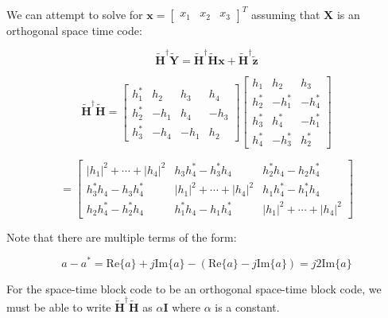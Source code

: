 \documentclass[fleqn]{article}
\begin{document}
\begin{enumerate}
\begin{enumerate}
			We can attempt to solve for $\mathbf{x} = \begin{bmatrix} x_1 & x_2 & x_3 \end{bmatrix}^T$ assuming that $\mathbf{X}$ is an orthogonal space time code:
			
			\begin{equation*}
				\mathbf{\tilde{H}^\dagger\tilde{Y}} = \mathbf{\tilde{H}^\dagger\tilde{H}x} + \mathbf{\tilde{H}^\dagger\tilde{z}}
			\end{equation*}
			
			\begin{equation*}
				\mathbf{\tilde{H}^\dagger\tilde{H}} = \begin{bmatrix}
					h_1^* &  h_2 &  h_3 &  h_4 \\
					h_2^* & -h_1 &  h_4 & -h_3 \\
					h_3^* & -h_4 & -h_1 &  h_2
				\end{bmatrix} \begin{bmatrix}
					h_1   &  h_2   &  h_3 \\
				    h_2^* & -h_1^* & -h_4^* \\
					h_3^* &  h_4^* & -h_1^* \\
					h_4^* & -h_3^* &  h_2^*
				\end{bmatrix}
			\end{equation*}
			
			\begin{equation*}
				= \begin{bmatrix}
					|h_1|^2 + \cdots + |h_4|^2 & h_3h_4^* - h_3^*h_4 & h_2^*h_4 - h_2h_4^* \\
					h_3^*h_4 - h_3h_4^* & |h_1|^2 + \cdots + |h_4|^2 & h_1h_4^* - h_1^*h_4 \\
					h_2h_4^* - h_2^*h_4 & h_1^*h_4 - h_1h_4^* & |h_1|^2 + \cdots + |h_4|^2
				\end{bmatrix}
			\end{equation*}
			
			Note that there are multiple terms of the form:
			
			\begin{equation*}
				a - a^* = \text{Re}\{a\} + j\text{Im}\{a\} - (\text{Re}\{a\} - j\text{Im}\{a\}) = j2\text{Im}\{a\}
			\end{equation*}
			
			For the space-time block code to be an orthogonal space-time block code, we must be able to write $\mathbf{\tilde{H}^{\dagger}\tilde{H}}$ as $\alpha\mathbf{I}$ where $\alpha$ is a constant.
			

\end{enumerate}
\end{enumerate}
\end{document}
